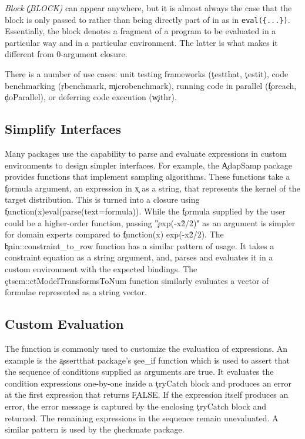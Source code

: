 \documentclass[review,screen,acmsmall]{acmart}
\newcommand{\authorcomment}[3]{\xspace\textcolor{#1}{{\bf #2} #3}\xspace}
\newcommand{\todo}[1]{\authorcomment{red}{TODO}{#1}}
\begin{document}
\begin{compactitem}[---]
  \item \emph{Block \c{(BLOCK)}} can appear anywhere, but it is almost always
    the case that the block is only passed to \eval rather than being directly
    part of in as in \lstinline|eval({...})|. Essentially, the block denotes a
    fragment of a program to be evaluated in a particular way and in a particular
    environment. The latter is what makes it different from 0-argument closure.

    There is a number of use cases: unit testing frameworks (\eg \c{testthat},
    \c{testit}), code benchmarking (\eg \c{rbenchmark}, \c{microbenchmark}),
    running code in parallel (\eg \c{foreach}, \c{doParallel}), or deferring
    code execution (\eg \c{withr}).

\end{compactitem}


\subsection{Simplify Interfaces}
Many packages use the capability to parse and evaluate expressions in custom
environments to design simpler interfaces. For example, the \c{AdapSamp} package
provides functions that implement sampling algorithms. These functions take a
\c{formula} argument, an expression in \c{x} as a string, that represents the
kernel of the target distribution. This is turned into a closure using
\c{function(x){eval(parse(text=formula))}}. While the \c{formula} supplied by
the user could be a higher-order function, passing \c{"exp(-x\^2/2)"} as an
argument is simpler for domain experts compared to \c{function(x) exp(-x\^2/2)}.
The \c{bain::constraint\_to\_row} function has a similar pattern of \eval usage.
It takes a constraint equation as a string argument, and, parses and evaluates
it in a custom environment with the expected bindings. The
\c{ctsem::ctModelTransformsToNum} function similarly evaluates a vector of
formulae represented as a string vector.

\subsection{Custom Evaluation}
The \eval function is commonly used to customize the evaluation of expressions.
An example is the \c{assertthat} package's \c{see\_if} function which is used to
assert that the sequence of conditions supplied as arguments are true. It
evaluates the condition expressions one-by-one inside a \c{tryCatch} block and
produces an error at the first expression that returns \c{FALSE}. If the
expression itself produces an error, the error message is captured by the
enclosing \c{tryCatch} block and returned. The remaining expressions in the
sequence remain unevaluated. A similar pattern is used by the \c{checkmate}
package.
\end{document}
